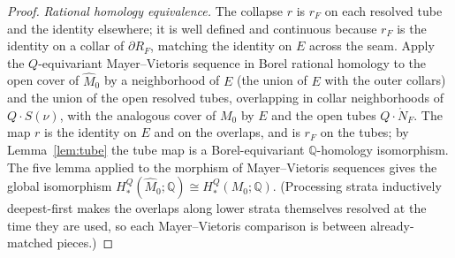 \documentclass[12pt]{article}
\theoremstyle{definition}
\begin{document}
\begin{proof}
\emph{Rational homology equivalence.} The collapse $r$ is $r_F$ on each resolved
tube and the identity elsewhere; it is well defined and continuous because $r_F$
is the identity on a collar of $\partial R_F$, matching the identity on $E$
across the seam. Apply the $Q$-equivariant Mayer--Vietoris
sequence in Borel rational homology to the open cover of $\widehat M_0$ by a
neighborhood of $E$ (the union of $E$ with the outer collars) and the union of
the open resolved tubes, overlapping in collar neighborhoods of
$Q\cdot S(\nu)$, with the analogous cover of $M_0$ by $E$ and the open tubes
$Q\cdot\mathring N_F$. The map $r$ is the
identity on $E$ and on the overlaps, and is $r_F$ on the tubes; by
Lemma~\ref{lem:tube} the tube map is a Borel-equivariant $\mathbb{Q}$-homology
isomorphism. The five lemma applied to the morphism of Mayer--Vietoris sequences
gives the global isomorphism $H^Q_*(\widehat M_0;\mathbb{Q})\cong
H^Q_*(M_0;\mathbb{Q})$. (Processing strata inductively deepest-first makes the
overlaps along lower strata themselves resolved at the time they are used, so
each Mayer--Vietoris comparison is between already-matched pieces.)
\end{proof}
\end{document}
